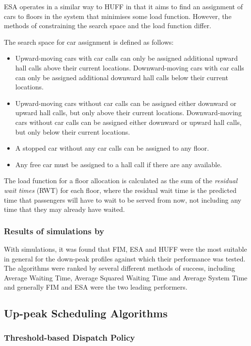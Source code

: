 \documentclass{UoYCSproject}
\begin{document}
ESA operates in a similar way to HUFF in that it aims to find an assignment of cars to floors in the system that minimises some load function.  However, the methods of constraining the search space and the load function differ.

The search space for car assignment is defined as follows:

\begin{itemize}
	\item Upward-moving cars with car calls can only be assigned additional upward hall calls above their current locations.  Downward-moving cars with car calls can only be assigned additional downward hall calls below their current locations.
	\item Upward-moving cars without car calls can be assigned either downward or upward hall calls, but only above their current locations.  Downward-moving cars without car calls can be assigned either downward or upward hall calls, but only below their current locations.
	\item A stopped car without any car calls can be assigned to any floor.
	\item Any free car must be assigned to a hall call if there are any available.
\end{itemize}

The load function for a floor allocation is calculated as the sum of the \textit{residual wait times} (RWT) for each floor, where the residual wait time is the predicted time that passengers will have to wait to be served from now, not including any time that they may already have waited.

\subsubsection{Results of simulations by \citet{Bao1994}}

With simulations, it was found that FIM, ESA and HUFF were the most suitable in general for the down-peak profiles against which their performance was tested.  The algorithms were ranked by several different methods of success, including Average Waiting Time, Average Squared Waiting Time and Average System Time and generally FIM and ESA were the two leading performers.

\subsection{Up-peak Scheduling Algorithms}

\subsubsection{Threshold-based Dispatch Policy \citep{Pepyne1997}}
\end{document}
